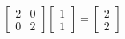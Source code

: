 \documentclass[preview]{standalone}
\begin{document}
\begin{align*}
\begin{bmatrix} 2 & 0 \\ 0 & 2 \end{bmatrix} \begin{bmatrix} 1 \\ 1 \end{bmatrix} = \begin{bmatrix} 2 \\ 2 \end{bmatrix}
\end{align*}
\end{document}
